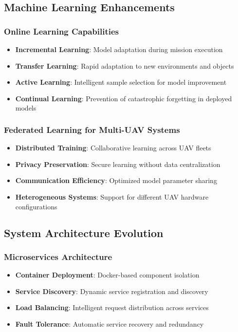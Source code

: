 \documentclass[12pt,a4paper]{article}
\begin{document}
\subsection{Machine Learning Enhancements}

\subsubsection{Online Learning Capabilities}

\begin{itemize}
    \item \textbf{Incremental Learning}: Model adaptation during mission execution
    \item \textbf{Transfer Learning}: Rapid adaptation to new environments and objects
    \item \textbf{Active Learning}: Intelligent sample selection for model improvement
    \item \textbf{Continual Learning}: Prevention of catastrophic forgetting in deployed models
\end{itemize}

\subsubsection{Federated Learning for Multi-UAV Systems}

\begin{itemize}
    \item \textbf{Distributed Training}: Collaborative learning across UAV fleets
    \item \textbf{Privacy Preservation}: Secure learning without data centralization
    \item \textbf{Communication Efficiency}: Optimized model parameter sharing
    \item \textbf{Heterogeneous Systems}: Support for different UAV hardware configurations
\end{itemize}

\subsection{System Architecture Evolution}

\subsubsection{Microservices Architecture}

\begin{itemize}
    \item \textbf{Container Deployment}: Docker-based component isolation
    \item \textbf{Service Discovery}: Dynamic service registration and discovery
    \item \textbf{Load Balancing}: Intelligent request distribution across services
    \item \textbf{Fault Tolerance}: Automatic service recovery and redundancy
\end{itemize}
\end{document}
